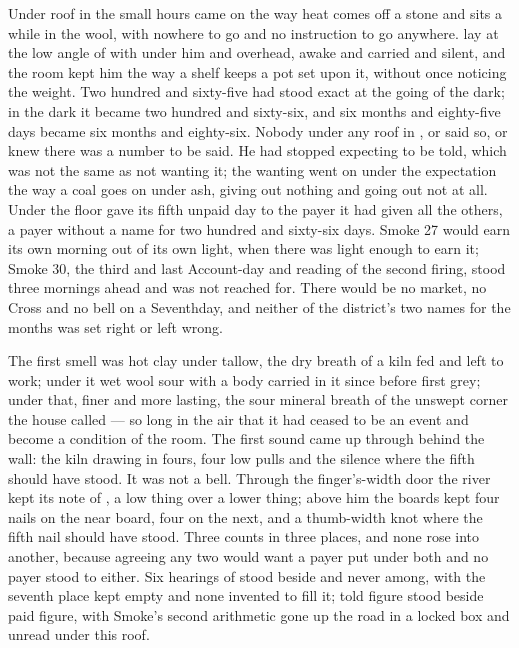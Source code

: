 
Under  roof in  the small hours came on the way heat comes off a stone and sits a while in the wool, with nowhere to go and no instruction to go anywhere.  lay at the low angle of  with  under him and  overhead, awake and carried and silent, and the room kept him the way a shelf keeps a pot set upon it, without once noticing the weight. Two hundred and sixty-five had stood exact at the going of the dark; in the dark it became two hundred and sixty-six, and six months and eighty-five days became six months and eighty-six. Nobody under any roof in ,  or  said so, or knew there was a number to be said. He had stopped expecting to be told, which was not the same as not wanting it; the wanting went on under the expectation the way a coal goes on under ash, giving out nothing and going out not at all. Under the floor  gave its fifth unpaid day to the payer it had given all the others, a payer without a name for two hundred and sixty-six days. Smoke 27 would earn its own morning out of its own light, when there was light enough to earn it; Smoke 30, the third and last Account-day and reading of the second firing, stood three mornings ahead and was not reached for. There would be no market, no Cross and no bell on a Seventhday, and neither of the district's two names for the months was set right or left wrong.

The first smell was hot clay under tallow, the dry breath of a kiln fed and left to work; under it wet wool sour with a body carried in it since before first grey; under that, finer and more lasting, the sour mineral breath of the unswept corner the house called  ---  so long in the air that it had ceased to be an event and become a condition of the room. The first sound came up through  behind the wall: the kiln drawing in fours, four low pulls and the silence where the fifth should have stood. It was not a bell. Through the finger's-width door the river kept its note of , a low thing over a lower thing; above him the boards kept four nails on the near board, four on the next, and a thumb-width knot where the fifth nail should have stood. Three counts in three places, and none rose into another, because agreeing any two would want a payer put under both and no payer stood to either. Six hearings of  stood beside and never among, with the seventh place kept empty and none invented to fill it; told figure stood beside paid figure, with Smoke's second arithmetic gone up the road in a locked box and unread under this roof.

